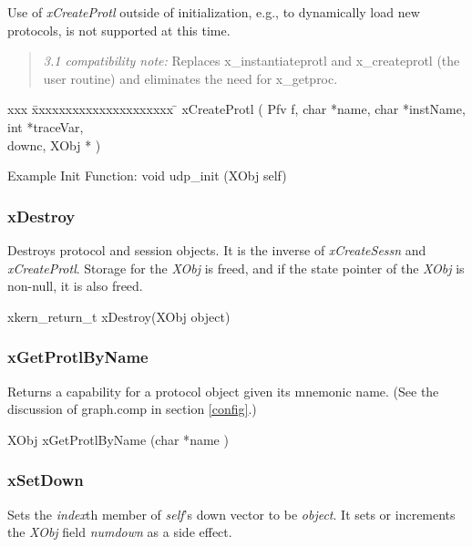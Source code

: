Use of {\em xCreateProtl} outside of initialization, e.g., to
dynamically load new protocols, is not supported at this time.

\begin{quote}
{\em 3.1 compatibility note:} Replaces x\_instantiateprotl and
x\_createprotl (the user routine) and eliminates the need for x\_getproc.
\end{quote}

\begin{tabbing}
xxx \= xxxxxxxxxxxxxxxxxxxxx \=   \kill
{} {\bold xCreateProtl} (
{\sem Pfv} {\caps f}, 
{\sem char} *{\caps name}, 
{\sem char} *{\caps instName}, 
{\sem int} *{\caps traceVar},\\
\> {\caps downc}, 
{\sem XObj} *{} 
)
\end{tabbing}

\medskip

{\sanss Example Init Function:} {\sem void} {\bold udp\_init} ({\sem XObj} {\caps self})

\subsubsection{xDestroy}

Destroys protocol and session objects. It is the inverse of {\em
xCreateSessn} and {\em xCreateProtl}.  Storage for the {\em XObj} is
freed, and if the state pointer of the {\em XObj} is non-null, it is
also freed.
\medskip

{\sem xkern\_return\_t} {\bold xDestroy}({\sem XObj} {\caps object})
\medskip

\subsubsection{xGetProtlByName}

Returns a capability for a protocol object given its mnemonic name.
(See the discussion of graph.comp in section \ref{config}.)
\medskip

{\sem XObj} {\bold xGetProtlByName} ({\sem char} *{\caps name} )

\subsubsection{xSetDown}

Sets the {\em index}th member of {\em self}'s down vector to be {\em
object}.  It sets or increments the {\em XObj} field {\em numdown} as
a side effect.
\medskip

